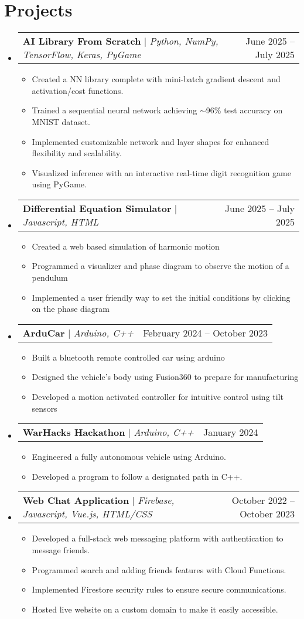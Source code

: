 \documentclass[letterpaper,11pt]{article}
\makeatletter
\newcommand{\resumeItem}[1]{
  \item\small{
    {#1 \vspace{-2pt}}
  }
}
\newcommand{\resumeProjectHeading}[2]{
    \item
    \begin{tabular*}{0.97\textwidth}{l@{\extracolsep{\fill}}r}
      \small#1 & #2 \\
    \end{tabular*}\vspace{-7pt}
}
\newcommand{\resumeSubHeadingListStart}{\begin{itemize}[leftmargin=0.15in, label={}]}
\newcommand{\resumeSubHeadingListEnd}{\end{itemize}}
\newcommand{\resumeItemListStart}{\begin{itemize}}
\newcommand{\resumeItemListEnd}{\end{itemize}\vspace{-5pt}}
\makeatother
\begin{document}
\section{Projects}
    \resumeSubHeadingListStart
      \resumeProjectHeading
          {\textbf{AI Library From Scratch} $|$ \emph{Python, NumPy, TensorFlow, Keras, PyGame}}{June 2025 -- July 2025}
          \resumeItemListStart
            \resumeItem{Created a NN library complete with mini-batch gradient descent and activation/cost functions.}
            \resumeItem{Trained a sequential neural network achieving $\sim$96\% test accuracy on MNIST dataset.}
            \resumeItem{Implemented customizable network and layer shapes for enhanced flexibility and scalability.}
            \resumeItem{Visualized inference with an interactive real-time digit recognition game using PyGame.}
          \resumeItemListEnd
      \resumeProjectHeading
          {\textbf{Differential Equation Simulator} $|$ \emph{Javascript, HTML}}{June 2025 -- July 2025}
          \resumeItemListStart
            \resumeItem{Created a web based simulation of harmonic motion}
            \resumeItem{Programmed a visualizer and phase diagram to observe the motion of a pendulum}
            \resumeItem{Implemented a user friendly way to set the initial conditions by clicking on the phase diagram}
          \resumeItemListEnd
      \resumeProjectHeading
          {\textbf{ArduCar} $|$ \emph{Arduino, C++}}{February 2024 -- October 2023}
          \resumeItemListStart
            \resumeItem{Built a bluetooth remote controlled car using arduino}
            \resumeItem{Designed the vehicle's body using Fusion360 to prepare for manufacturing}
            \resumeItem{Developed a motion activated controller for intuitive control using tilt sensors}
          \resumeItemListEnd
      \resumeProjectHeading
          {\textbf{WarHacks Hackathon} $|$ \emph{Arduino, C++}}{January 2024}
          \resumeItemListStart
            \resumeItem{Engineered a fully autonomous vehicle using Arduino.}
            \resumeItem{Developed a program to follow a designated path in C++.}
          \resumeItemListEnd
      \resumeProjectHeading
          {\textbf{Web Chat Application} $|$ \emph{Firebase, Javascript, Vue.js, HTML/CSS}}{October 2022 -- October 2023}
          \resumeItemListStart
            \resumeItem{Developed a full-stack web messaging platform with authentication to message friends.}
            \resumeItem{Programmed search and adding friends features with Cloud Functions.}
            \resumeItem{Implemented Firestore security rules to ensure secure communications.}
            \resumeItem{Hosted live website on a custom domain to make it easily accessible.}
          \resumeItemListEnd
    \resumeSubHeadingListEnd
\end{document}
